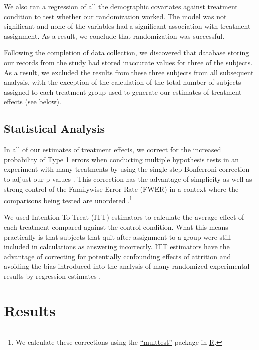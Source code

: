 \documentclass{cscw2010}
\begin{document}
We also ran a regression of all the demographic covariates against
treatment condition to test whether our randomization worked. The
model was not significant and none of the variables had a significant
association with treatment assignment. As a result, we conclude that
randomization was successful.

Following the completion of data collection, we discovered that
database storing our records from the study had stored inaccurate
values for three of the subjects. As a result, we excluded the results
from these three subjects from all subsequent analysis, with the
exception of the calculation of the total number of subjects assigned
to each treatment group used to generate our estimates of treatment
effects (see below).

\subsection{Statistical Analysis} 

In all of our estimates of treatment effects, we correct for the
increased probability of Type 1 errors when conducting multiple
hypothesis tests in an experiment with many treatments by using the
single-step Bonferroni correction to adjust our p-values
\cite{shaffer1995, hsu1996}. This correction has the advantage of
simplicity as well as strong control of the Familywise Error Rate
(FWER) in a context where the comparisons being tested are unordered
\cite{rosenthalrubin1984}.\footnote{We calculate these corrections
  using the
  \href{http://cran.r-project.org/web/packages/multtest/index.html}{``multtest''}
  package in \href{http://www.r-project.org}{R}.}

We used Intention-To-Treat (ITT) estimators to calculate the average
effect of each treatment compared against the control condition. What
this means practically is that subjects that quit after assignment to
a group were still included in calculations as answering
incorrectly. ITT estimators have the advantage of correcting for
potentially confounding effects of attrition and avoiding the bias
introduced into the analysis of many randomized experimental results
by regression estimates \cite{freedman2008logistic,
  freedman2008multtreat}.

\section{Results}
\end{document}
